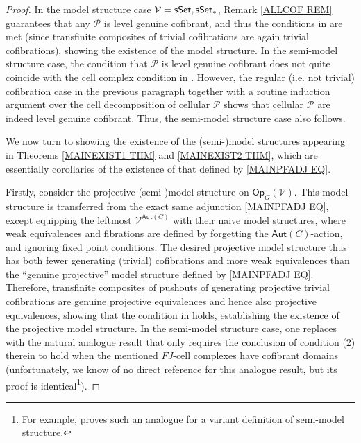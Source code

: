 \documentclass[a4paper,10pt
,draft
]{article}%
\numberwithin{equation}{section}
\numberwithin{figure}{section}
\theoremstyle{definition} %
\renewcommand{\P}{\ensuremath{\mathcal P}}
\newcommand{\1}{\ensuremath{\mathbbm 1}}%
\begin{document}
\begin{proof}
In the model structure case 
$\mathcal{V} = \mathsf{sSet},\mathsf{sSet}_{\**}$,
Remark \ref{ALLCOF REM}
guarantees that any 
$\mathcal{P}$ is level genuine cofibrant,
and thus the conditions in
\cite[Thm. 11.3.2]{Hi03} are met (since transfinite composites of trivial cofibrations are again trivial cofibrations),
showing the existence of the model structure.
In the semi-model structure case, the condition that 
$\mathcal{P}$ is level genuine cofibrant
does not quite coincide with the cell complex condition in \cite[Thm. 2.2.2]{WY18}. 
However, the regular (i.e. not trivial) 
cofibration case in the previous paragraph together with a routine induction argument over the cell decomposition of cellular $\P$ shows that cellular  
$\P$ are indeed level genuine cofibrant.
Thus, the semi-model structure case also follows.

We now turn to showing the existence of the (semi-)model structures appearing in Theorems \ref{MAINEXIST1 THM} and \ref{MAINEXIST2 THM},
which are essentially corollaries 
of the existence of that defined by
\eqref{MAINPFADJ EQ}.

Firstly, consider the projective (semi-)model structure
on $\mathsf{Op}_G(\mathcal{V})$.
This model structure is transferred from the exact same adjunction
\eqref{MAINPFADJ EQ}, except equipping the 
leftmost $\mathcal{V}^{\mathsf{Aut}(C)}$
with their naive model structures, where weak equivalences and fibrations are defined by forgetting the $\mathsf{Aut}(C)$-action,
and ignoring fixed point conditions.
The desired projective model structure thus
has both fewer generating (trivial) cofibrations
and more weak equivalences than the ``genuine projective'' model structure defined by \eqref{MAINPFADJ EQ}.
Therefore, transfinite composites of pushouts of generating projective trivial cofibrations 
are genuine projective equivalences and hence also projective equivalences, showing that the condition in 
\cite[Thm. 11.3.2(2)]{Hi03}
holds,
establishing the existence of the projective model structure. 
In the semi-model structure case,
one replaces \cite[Thm. 11.3.2]{Hi03}
with the natural analogue result
that only requires the conclusion of condition (2) therein
to hold when the mentioned $FJ$-cell complexes 
have cofibrant domains
(unfortunately, we know of no direct reference for this analogue result, but its proof is identical\footnote{For example, \cite[Thm. 2]{Spi01}
proves such an analogue for a variant definition
of semi-model structure.}).
%



\end{proof}
\end{document}
